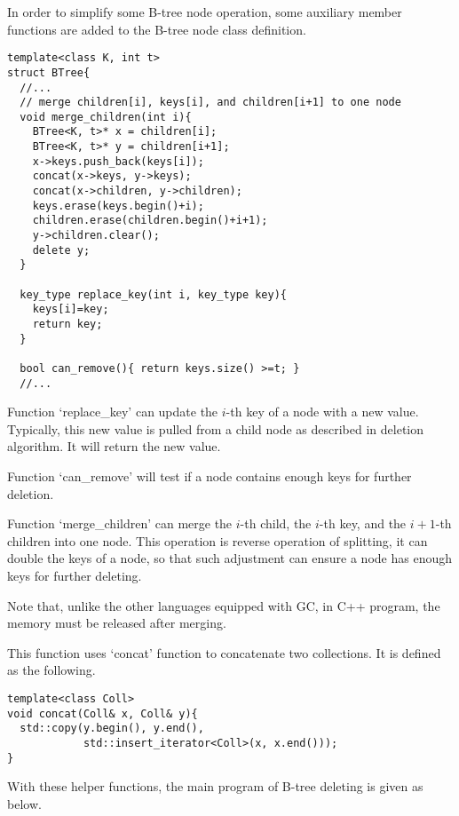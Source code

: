 \documentclass{article}
\begin{document}
In order to simplify some B-tree node operation, some auxiliary
member functions are added to the B-tree node class definition.

\lstset{language=C++}
\begin{lstlisting}
template<class K, int t>
struct BTree{
  //...
  // merge children[i], keys[i], and children[i+1] to one node
  void merge_children(int i){
    BTree<K, t>* x = children[i];
    BTree<K, t>* y = children[i+1];
    x->keys.push_back(keys[i]);
    concat(x->keys, y->keys);
    concat(x->children, y->children);
    keys.erase(keys.begin()+i);
    children.erase(children.begin()+i+1);
    y->children.clear();
    delete y;
  }

  key_type replace_key(int i, key_type key){
    keys[i]=key;
    return key;
  }

  bool can_remove(){ return keys.size() >=t; }
  //...
\end{lstlisting}

Function `replace\_key' can update the $i$-th key of a node with a
new value. Typically, this new value is pulled from a child node as
described in deletion algorithm. It will return the new value.

Function `can\_remove' will test if a node contains enough keys for
further deletion.

Function `merge\_children' can merge the $i$-th child, the $i$-th key,
and the $i+1$-th children into one node. This operation is reverse
operation of splitting, it can double the keys of a node, so that
such adjustment can ensure a node has enough keys for further deleting.

Note that, unlike the other languages equipped with GC, in C++ program,
the memory must be released after merging.

This function uses `concat' function to concatenate two collections.
It is defined as the following.

\begin{lstlisting}
template<class Coll>
void concat(Coll& x, Coll& y){
  std::copy(y.begin(), y.end(),
            std::insert_iterator<Coll>(x, x.end()));
}
\end{lstlisting}

With these helper functions, the main program of B-tree deleting
is given as below.
\end{document}
